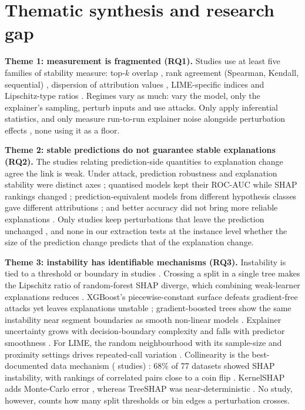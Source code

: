 \section{Thematic synthesis and research gap}\label{sec:synth}
\textbf{Theme 1: measurement is fragmented (RQ1).} Studies use at least five families of stability measure: top-$k$ overlap \cite{S07,S08,S21,S36,S54}, rank agreement (Spearman, Kendall, sequential) \cite{S29,S34,S53,S56}, dispersion of attribution values \cite{S24,S38,S47}, LIME-specific indices \cite{S10,S39} and Lipschitz-type ratios \cite{S01,S05,S09,S23,S25}. Regimes vary as much: \mapsrcretrain{} vary the model, \mapsrcnoise{} only the explainer's sampling, \mapsrcperturb{} perturb inputs and \mapsrcadversarial{} use attacks. Only \mapst{} apply inferential statistics, and only \mapnoiseandperturb{} measure run-to-run explainer noise alongside perturbation effects \evnoiseandperturb, none using it as a floor.

\textbf{Theme 2: stable predictions do not guarantee stable explanations (RQ2).} The \mappe{} studies relating prediction-side quantities to explanation change agree the link is weak. Under attack, prediction robustness and explanation stability were distinct axes \cite{S59}; quantised models kept their ROC-AUC while SHAP rankings changed \cite{S50}; prediction-equivalent models from different hypothesis classes gave different attributions \cite{S75}; and better accuracy did not bring more reliable explanations \cite{S51,S79}. Only \mappp{} studies keep perturbations that leave the prediction unchanged \evpp, and none in our extraction tests at the instance level whether the size of the prediction change predicts that of the explanation change.

\textbf{Theme 3: instability has identifiable mechanisms (RQ3).} Instability is tied to a threshold or boundary in \mapmechthr{} studies \evmechthr. Crossing a split in a single tree makes the Lipschitz ratio of random-forest SHAP diverge, which combining weak-learner explanations reduces \cite{S25}. XGBoost's piecewise-constant surface defeats gradient-free attacks yet leaves explanations unstable \cite{S59}; gradient-boosted trees show the same instability near segment boundaries as smooth non-linear models \cite{S77}. Explainer uncertainty grows with decision-boundary complexity \cite{S19} and falls with predictor smoothness \cite{S23}. For LIME, the random neighbourhood with its sample-size and proximity settings drives repeated-call variation \cite{S02,S08,S10}. Collinearity is the best-documented data mechanism (\mapmechcoll{} studies) \evmechcoll: 68\% of 77 datasets showed SHAP instability, with rankings of correlated pairs close to a coin flip \cite{S43}. KernelSHAP adds Monte-Carlo error \cite{S18,S21,S31}, whereas TreeSHAP was near-deterministic \cite{S45,S46}. No study, however, counts how many split thresholds or bin edges a perturbation crosses.

